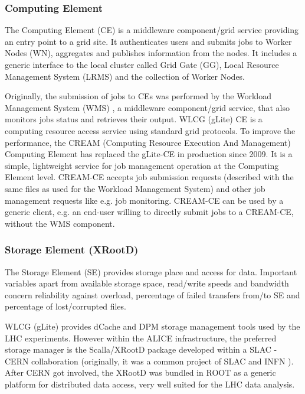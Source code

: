 \subsubsection{Computing Element}
%
The Computing Element (CE) \cite{CE} is a middleware component/grid
service providing an entry point to a grid site. It authenticates
users and submits jobs to Worker Nodes (WN), aggregates and
publishes information from the nodes. It includes a generic
interface to the local cluster called Grid Gate (GG), Local Resource
Management System (LRMS) and the collection of Worker Nodes.

Originally, the submission of jobs to CEs was performed by the Workload
Management System (WMS) \cite{WMS}, a middleware component/grid service,
that also monitors jobs status and retrieves their output. WLCG
(gLite) CE is a computing resource access service using standard
grid protocols. To improve the performance, the CREAM (Computing
Resource Execution And Management) Computing Element \cite{CREAMCE} has
replaced the gLite-CE in production since 2009. It is a
simple, lightweight service for job management operation at the
Computing Element level. CREAM-CE accepts job submission requests
(described with the same files as used for the Workload Management
System) and other job management requests like e.g. job monitoring.
CREAM-CE can be used by a generic client, e.g. an end-user willing
to directly submit jobs to a CREAM-CE, without the WMS component.

\subsubsection{Storage Element (XRootD)}
%
The Storage Element (SE) \cite{SE} provides storage place and access for
data. Important variables apart from available storage space,
read/write speeds and bandwidth concern reliability against
overload, percentage of failed transfers from/to SE and percentage
of lost/corrupted files.

WLCG (gLite) provides dCache \cite{dcache} and DPM \cite{dpm} storage management
tools used by the LHC experiments. However within the ALICE
infrastructure, the preferred storage manager is the Scalla/XRootD
package \cite{xrootd} developed within a SLAC \cite{slac} - CERN collaboration
(originally, it was a common project of SLAC and INFN \cite{INFN}). After
CERN got involved, the XRootD was bundled in ROOT \cite{ROOT} as a generic
platform for distributed data access, very well suited for the LHC
data analysis.

